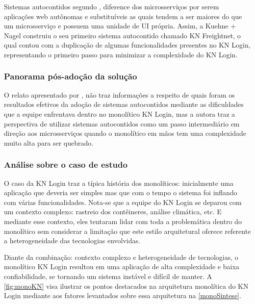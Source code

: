 Sistemas autocontidos segundo , diference dos
microsserviços por serem aplicações web autônomas e substituíveis as quais tendem a ser maiores do
que um microsserviço e possuem uma unidade de \gls{UI} própria. Assim, a Kuehne + Nagel construiu o
seu primeiro sistema autocontido chamado KN Freightnet, o qual contou com a duplicação de algumas
funcionalidades presentes no KN Login, representando o primeiro passo para minimizar a complexidade
do KN Login.

\subsubsection{Panorama pós-adoção da solução}

O relato apresentado por , não traz informações a respeito
de quais foram os resultados efetivos da adoção de sistemas autocontidos mediante as dificuldades
que a equipe enfrentava dentro no monolítico KN Login, mas a autora traz a perspectiva de utilizar
sistemas autocontidos como um passo intermediário em direção aos microsserviços quando o monolítico
em mãos tem uma complexidade muito alta para ser quebrado.

\subsubsection{Análise sobre o caso de estudo}

O caso da KN Login traz a típica história dos monolíticos: inicialmente uma aplicação que deveria
ser simples mas que com o tempo o sistema foi inflando com várias funcionalidades. Nota-se que a
equipe do KN Login se deparou com um contexto complexo: rastreio dos contêineres, análise climática,
etc. E mediante esse contexto, eles tentaram lidar com toda a problemática dentro do monolítico sem
considerar a limitação que este estilo arquitetural oferece referente a heterogeneidade das
tecnologias envolvidas.

Diante da combinação: contexto complexo e heterogeneidade de tecnologias, o monolítico KN Login
resultou em uma aplicação de alta complexidade e baixa confiabilidade, se tornando um sistema
instável e difícil de manter. A \autoref{fig:monoKN} visa ilustrar os pontos destacados na
arquitetura monolítica do KN Login mediante aos fatores levantados sobre essa arquitetura na
\autoref{monoSintese}. 


